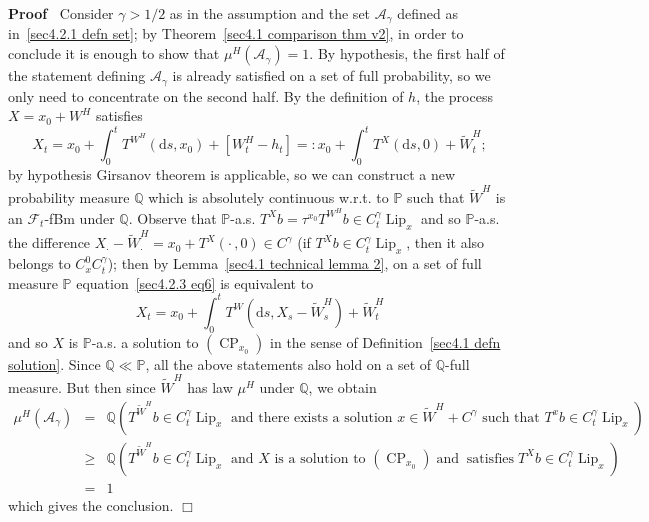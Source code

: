 \documentclass[10pt]{article}
\newcommand{\backassign}{=:}
\newcommand{\mathd}{\mathrm{d}}
\newcommand{\tmop}[1]{\ensuremath{\operatorname{#1}}}
\newenvironment{proof}{\noindent\textbf{Proof\ }}{\hspace*{\fill}$\Box$\medskip}
\begin{document}
\begin{proof}
  Consider $\gamma > 1 / 2$ as in the assumption and the set
  $\mathcal{A}_{\gamma}$ defined as in~{\eqref{sec4.2.1 defn set}}; by
  Theorem~\ref{sec4.1 comparison thm v2}, in order to conclude it is enough to
  show that $\mu^H (\mathcal{A}_{\gamma}) = 1$. By hypothesis, the first half
  of the statement defining $\mathcal{A}_{\gamma}$ is already satisfied on a
  set of full probability, so we only need to concentrate on the second half.
  By the definition of $h$, the process $X = x_0 + W^H$ satisfies
  \begin{equation}
    X_t = x_0 + \int_0^t T^{W^H} (\mathd s, x_0) + [W^H_t - h_t] \backassign
    x_0 + \int_0^t T^X (\mathd s, 0) + \tilde{W}^H_t ; \label{sec4.2.3 eq6}
  \end{equation}
  by hypothesis Girsanov theorem is applicable, so we can construct a new
  probability measure $\mathbb{Q}$ which is absolutely continuous w.r.t. to
  $\mathbb{P}$ such that $\tilde{W}^H$ is an $\mathcal{F}_t$\mbox{-}fBm under
  $\mathbb{Q}$. Observe that $\mathbb{P}$\mbox{-}a.s. $T^X b = \tau^{x_0}
  T^{W^H} b \in C^{\gamma}_t \tmop{Lip}_x$ and so $\mathbb{P}$-a.s. the
  difference $X_{\cdot} - \tilde{W}^H_{\cdot} = x_0 + T^X \left( \cdot \,, 0
  \right) \in C^{\gamma}$ (if $T^X b \in C^{\gamma}_t \tmop{Lip}_x$, then it
  also belongs to $C^0_x C^{\gamma}_t$); then by Lemma~\ref{sec4.1 technical
  lemma 2}, on a set of full measure $\mathbb{P}$ equation~{\eqref{sec4.2.3
  eq6}} is equivalent to
  \[ X_t = x_0 + \int_0^t T^W (\mathd s, X_s - \tilde{W}_s^H) + \tilde{W}^H_t
  \]
  and so $X$ is $\mathbb{P}$\mbox{-}a.s. a solution to $(\tmop{CP}_{x_0})$ in
  the sense of Definition~\ref{sec4.1 defn solution}. Since $\mathbb{Q} \ll
  \mathbb{P}$, all the above statements also hold on a set of
  $\mathbb{Q}$\mbox{-}full measure. But then since $\tilde{W}^H$ has law
  $\mu^H$ under $\mathbb{Q}$, we obtain
  \begin{eqnarray*}
    \mu^H (\mathcal{A}_{\gamma}) & = & \mathbb{Q} \left( T^{\tilde{W}^H} b \in
    C^{\gamma}_t \tmop{Lip}_x \text{ and there exists a solution } x \in
    \tilde{W}^H + C^{\gamma} \text{ such that } T^x b \in C^{\gamma}_t
    \tmop{Lip}_x \right)\\
    & \geqslant & \mathbb{Q} \left( T^{\tilde{W}^H} b \in C^{\gamma}_t
    \tmop{Lip}_x \text{ and $X$ is a solution to $(\tmop{CP}_{x_0}) \tmop{and}
    \tmop{satisfies}$} T^X b \in C^{\gamma}_t \tmop{Lip}_x \right)\\
    & = & 1
  \end{eqnarray*}
  which gives the conclusion.
\end{proof}
\end{document}

